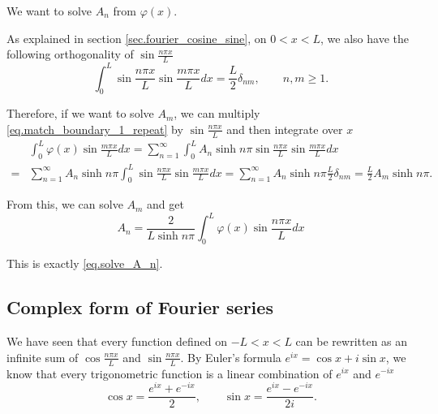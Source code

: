 We want to solve $A_n$ from $\varphi(x)$.

As explained in section \ref{sec.fourier_cosine_sine}, on $0 < x < L$, we also have the following orthogonality of $\sin \frac{n \pi x}{L}$
\begin{equation}\label{eq.solve_A_n_1}
    \int_{0}^L \sin \frac{n \pi x}{L} \sin \frac{m \pi x}{L} d x= \frac{L}{2} \delta_{n m}, \qquad n,m\ge 1.
\end{equation}

Therefore, if we want to solve $A_m$, we can multiply \eqref{eq.match_boundary_1_repeat} by  $\sin \frac{n \pi x}{L}$ and then integrate over $x$
$$
\begin{aligned}
&\int_{0}^L \varphi(x) \sin \frac{m \pi x}{L} d x  = \sum_{n=1}^{\infty} \int_{0}^L A_n \sinh n \pi \sin \frac{n \pi x}{L} \sin \frac{m \pi x}{L} d x \\
=&\sum_{n=1}^{\infty}  A_n \sinh n \pi \int_{0}^L \sin \frac{n \pi x}{L} \sin \frac{m \pi x}{L} d x=\sum_{n=1}^{\infty}  A_n \sinh n \pi \frac{L}{2} \delta_{n m}= \frac{L}{2} A_m \sinh n \pi .
\end{aligned}
$$

From this, we can solve $A_m$ and get
\begin{equation}\label{eq.solve_A_n_2}
    A_n = \frac{2}{L\sinh n\pi}\int_{0}^{L}\varphi(x)\sin \frac{n \pi x}{L} dx
\end{equation}

This is exactly \eqref{eq.solve_A_n}.

\subsection{Complex form of Fourier series}

We have seen that every function defined on $-L < x < L$ can be rewritten as an infinite sum of $\cos \frac{n \pi x}{L}$ and $\sin \frac{n \pi x}{L}$. By Euler's formula $e^{ix} = \cos x + i\sin x$, we know that every trigonometric function is a linear combination of $e^{ix}$ and $e^{-ix}$
\begin{equation}\label{eq.cos_sin_to_e^ix}
    \cos x = \frac{e^{ix}+e^{-ix}}{2}, \qquad \sin x = \frac{e^{ix}-e^{-ix}}{2i}.
\end{equation}

